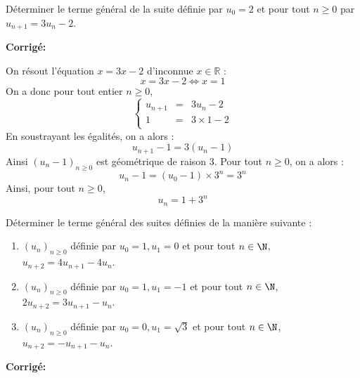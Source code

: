\documentclass[a4paper,twoside,french,10pt]{VcCours}
\newcommand{\corr}{\textbf{Corrigé:}}
\begin{document}
\medskip


\begin{Exercice}{} Déterminer le terme général de la suite définie par $u_0=2$ et pour tout $n \geq 0$ par $u_{n+1}=3u_n-2$.
\end{Exercice} 

\corr

On résout l'équation $x= 3x-2$ d'inconnue $x \in \mathbb{R}$ :
$$ x=3x-2 \Longleftrightarrow x =1 $$
On a donc pour tout entier $n \geq 0$,
$$ \left\lbrace \begin{array}{ccl}
u_{n+1} & = & 3 u_n - 2 \\
1 & = & 3 \times 1 - 2 \\
\end{array}\right. $$
En soustrayant les égalités, on a alors :
$$ u_{n+1} - 1 = 3(u_n - 1)$$
Ainsi $( u_{n} - 1 )_{n \geq 0}$ est géométrique de raison $3$. Pour tout $n \geq 0$, on a alors :
$$  u_{n} - 1 = ( u_{0} - 1) \times 3^n = 3^n $$
Ainsi, pour tout $n \geq 0$,
$$ u_n = 1+ 3^n$$

\medskip



\begin{Exercice}{}\label{rec} Déterminer le terme général des suites définies de la manière suivante :
    \begin{enumerate}
      \item
        $(u_n)_{n \geq 0}$ définie par $u_0 = 1,u_1 = 0$ et pour tout $n \in \N$, $u_{n + 2} = 4u_{n + 1} - 4u_n$.
      \item
        $(u_n)_{n \geq 0}$ définie par $u_0 = 1,u_1 = - 1$ et pour tout $n \in \N$, $2u_{n + 2} = 3u_{n + 1} - u_n$.
        \item
        $(u_n)_{n \geq 0}$ définie par $u_0 = 0,u_1 = \sqrt{3}$ et pour tout $n \in \N$, $u_{n + 2} = -u_{n+1}- u_n$.

    \end{enumerate}
\end{Exercice}    

\corr
\end{document}
